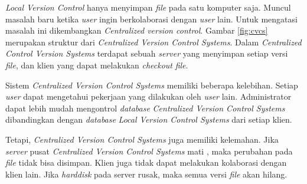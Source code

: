 \textit{Local Version Control} hanya menyimpan \textit{file} pada satu komputer saja. Muncul masalah baru ketika \textit{user} ingin berkolaborasi dengan \textit{user} lain. Untuk mengatasi masalah ini dikembangkan \textit{Centralized version control}. Gambar \ref{fig:cvcs} merupakan struktur dari \textit{Centralized Version Control Systems}. Dalam \textit{Centralized Control Version Systems} terdapat sebuah \textit{server} yang menyimpan setiap versi \textit{file}, dan klien yang dapat melakukan \textit{checkout} \textit{file}\cite{chacon2014pro}.

Sistem \textit{Centralized Version Control Systems} memiliki beberapa kelebihan. Setiap \textit{user}  dapat mengetahui pekerjaan yang dilakukan oleh \textit{user} lain. Administrator dapat lebih mudah mengontrol \textit{database} \textit{Centralized Version Control Systems} dibandingkan dengan \textit{database} \textit{Local Version Control Systems} dari setiap klien.      

Tetapi, \textit{Centralized Version Control Systems} juga memiliki kelemahan. Jika \textit{server} pusat \textit{Centralized Version Control Systems} mati , maka perubahan pada \textit{file} tidak bisa disimpan. Klien juga tidak dapat melakukan kolaborasi dengan klien lain. Jika \textit{harddisk} pada server rusak, maka semua versi \textit{file} akan hilang.  

